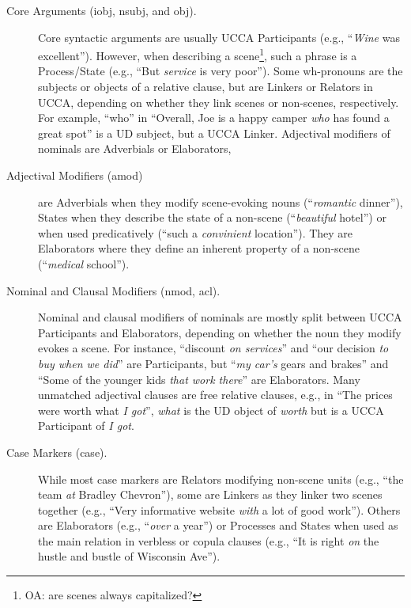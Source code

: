 \documentclass[11pt,a4paper]{article}
\newcommand{\oa}[1]{\footnote{\color{red}OA: #1}}
\begin{document}
\begin{description}
    \item[Core Arguments (iobj, nsubj, and obj).] 
      Core syntactic arguments are usually UCCA Participants (e.g., ``\textit{Wine} was excellent'').
      However, when describing a scene\oa{are scenes always capitalized?}, such a phrase is a Process/State
      (e.g., ``But \textit{service} is very poor'').
      Some wh-pronouns are the subjects or objects of a relative clause, but
      are Linkers or Relators in UCCA,
      depending on whether they link scenes or non-scenes, respectively.
      For example, ``who'' in ``Overall, Joe is a happy camper \textit{who} has found a great spot'' is a UD
      subject, but a UCCA Linker.
      Adjectival modifiers of nominals are Adverbials or Elaborators,

    \item[Adjectival Modifiers (amod)] are Adverbials when they modify scene-evoking
    nouns (``\textit{romantic} dinner''), States when they describe the state of
    a non-scene (``\textit{beautiful} hotel'') or when used predicatively (``such a \textit{convinient} location'').
    They are Elaborators where they define an inherent property of a non-scene (``\textit{medical} school'').

    \item[Nominal and Clausal Modifiers (nmod, acl).] 
    Nominal and clausal modifiers of nominals
    are mostly split between UCCA Participants and Elaborators,
    depending on whether the noun they modify evokes a scene. For instance, 
    ``discount \textit{on services}'' and
    ``our decision \textit{to buy when we did}'' are Participants,
    but ``\textit{my car's} gears and brakes'' and ``Some of the younger kids \textit{that work there}'' are Elaborators.
    Many unmatched adjectival clauses are
    free relative clauses, e.g., in ``The prices were worth what \textit{I got}'',
    \textit{what} is the UD object of \textit{worth} but
    is a UCCA Participant of \textit{I got}.

    \item[Case Markers (case).]
      While most case markers are Relators
      modifying non-scene units (e.g., ``the team \textit{at} Bradley Chevron''),
      some are Linkers as they linker two scenes together 
      (e.g., ``Very informative website \textit{with} a lot of good work'').
      Others are Elaborators (e.g., ``\textit{over} a year'') or Processes and States
      when used as the main relation in verbless or copula clauses
      (e.g., ``It is right \textit{on} the hustle and bustle of Wisconsin Ave'').
    

\end{description}
\end{document}

